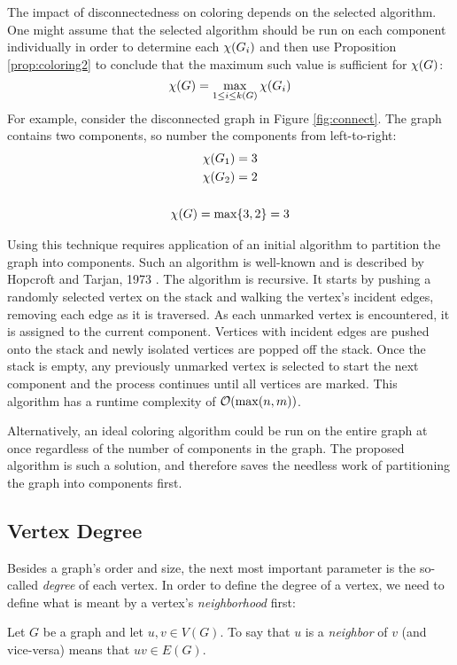 The impact of disconnectedness on coloring depends on the selected algorithm.  One might assume that the selected
algorithm should be run on each component individually in order to determine each \(\chi(G_i)\) and then use Proposition
\ref{prop:coloring2} to conclude that the maximum such value is sufficient for \(\chi(G)\):
\[\chi(G)=\max_{1\le i\le k(G)}\chi(G_i)\]
For example, consider the disconnected graph in Figure \ref{fig:connect}.  The graph contains two components, so
number the components from left-to-right:
\begin{gather*}
  \chi(G_1)=3 \\
  \chi(G_2)=2 \\
  \\
  \chi(G)=\max\{3,2\}=3
\end{gather*}

Using this technique requires application of an initial algorithm to partition the graph into components.  Such an
algorithm is well-known and is described by Hopcroft and Tarjan, 1973 \cite{hopcroft}.  The algorithm is recursive.
It starts by pushing a randomly selected vertex on the stack and walking the vertex's incident edges, removing each
edge as it is traversed.  As each unmarked vertex is encountered, it is assigned to the current component.
Vertices with incident edges are pushed onto the stack and newly isolated vertices are popped off the stack.  Once
the stack is empty, any previously unmarked vertex is selected to start the next component and the process
continues until all vertices are marked.  This algorithm has a runtime complexity of \(\mathcal{O}(\max(n,m))\).

Alternatively, an ideal coloring algorithm could be run on the entire graph at once regardless of the number of
components in the graph.  The proposed algorithm is such a solution, and therefore saves the needless work of
partitioning the graph into components first.

\subsection{Vertex Degree}

Besides a graph's order and size, the next most important parameter is the so-called \emph{degree} of each vertex.
In order to define the degree of a vertex, we need to define what is meant by a vertex's \emph{neighborhood} first:

\begin{definition}[Neighbor]
  Let \(G\) be a graph and let \(u,v\in V(G)\).  To say that \(u\) is a \emph{neighbor} of \(v\) (and vice-versa)
  means that \(uv\in E(G)\).
\end{definition}

